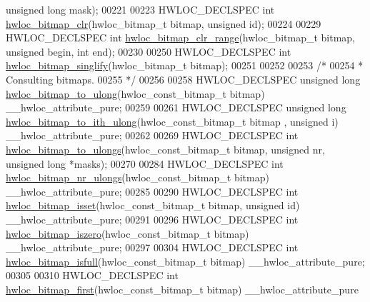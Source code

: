 \begin{DoxyCode}
{      unsigned} \textcolor{keywordtype}{long} mask);
00221 
00223 HWLOC\_DECLSPEC \textcolor{keywordtype}{int} \hyperlink{a00205_gaf20bb350b6844d08931a064a73f86743}{hwloc\_bitmap\_clr}(hwloc\_bitmap\_t bitmap, \textcolor{keywordtype}{unsigned} \textcolor{keywordtype}{id});
00224 
00229 HWLOC\_DECLSPEC \textcolor{keywordtype}{int} \hyperlink{a00205_ga833776709df94d727f8c22304b3388cf}{hwloc\_bitmap\_clr\_range}(hwloc\_bitmap\_t bitmap, \textcolor{keywordtype}{unsigned} begin, \textcolor{keywordtype}{int} 
      end);
00230 
00250 HWLOC\_DECLSPEC \textcolor{keywordtype}{int} \hyperlink{a00205_gaa611a77c092e679246afdf9a60d5db8b}{hwloc\_bitmap\_singlify}(hwloc\_bitmap\_t bitmap);
00251 
00252 
00253 \textcolor{comment}{/*}
00254 \textcolor{comment}{ * Consulting bitmaps.}
00255 \textcolor{comment}{ */}
00256 
00258 HWLOC\_DECLSPEC \textcolor{keywordtype}{unsigned} \textcolor{keywordtype}{long} \hyperlink{a00205_gab6a6bae22a33ec6adfc169a953c13e6c}{hwloc\_bitmap\_to\_ulong}(hwloc\_const\_bitmap\_t bitmap) 
      \_\_hwloc\_attribute\_pure;
00259 
00261 HWLOC\_DECLSPEC \textcolor{keywordtype}{unsigned} \textcolor{keywordtype}{long} \hyperlink{a00205_gac92e6404f648d6b99d2c626b05b2ffa4}{hwloc\_bitmap\_to\_ith\_ulong}(hwloc\_const\_bitmap\_t bitmap
      , \textcolor{keywordtype}{unsigned} i) \_\_hwloc\_attribute\_pure;
00262 
00269 HWLOC\_DECLSPEC \textcolor{keywordtype}{int} \hyperlink{a00205_gacd215a2348732de25d94a4ecd76d528c}{hwloc\_bitmap\_to\_ulongs}(hwloc\_const\_bitmap\_t bitmap, \textcolor{keywordtype}{unsigned} nr, \textcolor{keywordtype}{
      unsigned} \textcolor{keywordtype}{long} *masks);
00270 
00284 HWLOC\_DECLSPEC \textcolor{keywordtype}{int} \hyperlink{a00205_gac0744734d761d65c977aece565364908}{hwloc\_bitmap\_nr\_ulongs}(hwloc\_const\_bitmap\_t bitmap) 
      \_\_hwloc\_attribute\_pure;
00285 
00290 HWLOC\_DECLSPEC \textcolor{keywordtype}{int} \hyperlink{a00205_ga11340dd487f110bb84f0a6e4ae90bd06}{hwloc\_bitmap\_isset}(hwloc\_const\_bitmap\_t bitmap, \textcolor{keywordtype}{unsigned} \textcolor{keywordtype}{id}) 
      \_\_hwloc\_attribute\_pure;
00291 
00296 HWLOC\_DECLSPEC \textcolor{keywordtype}{int} \hyperlink{a00205_ga5b64be28f5a7176ed8ad0d6a90bdf108}{hwloc\_bitmap\_iszero}(hwloc\_const\_bitmap\_t bitmap) 
      \_\_hwloc\_attribute\_pure;
00297 
00304 HWLOC\_DECLSPEC \textcolor{keywordtype}{int} \hyperlink{a00205_ga5fdcb8c19c336511c37076d649e74af4}{hwloc\_bitmap\_isfull}(hwloc\_const\_bitmap\_t bitmap) 
      \_\_hwloc\_attribute\_pure;
00305 
00310 HWLOC\_DECLSPEC \textcolor{keywordtype}{int} \hyperlink{a00205_ga3ec1ced43afadf8c0a7197320bc016ed}{hwloc\_bitmap\_first}(hwloc\_const\_bitmap\_t bitmap) \_\_hwloc\_attribute\_pure

\end{DoxyCode}
